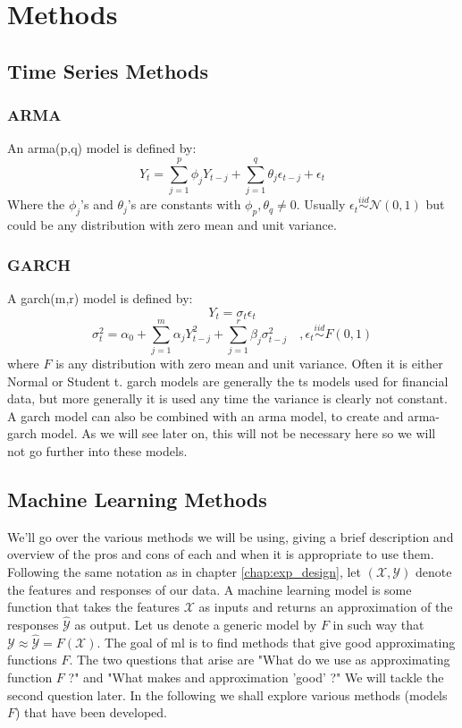 \chapter{Methods}

\section{Time Series Methods}
\subsection{ARMA}
An \acrfull{arma}(p,q) model is defined by:
$$
Y_t = \sum_{j=1}^p \phi_j Y_{t-j} + \sum_{j=1}^q \theta_j \epsilon_{t-j} + \epsilon_t
$$
Where the $\phi_j$'s and $\theta_j$'s are constants with $\phi_p , \theta_q \neq 0$. Usually $\epsilon_t \stackrel{iid}{\sim} \mathcal{N}(0,1)$ but could be any distribution with zero mean and unit variance.
\subsection{GARCH}
A \acrfull{garch}(m,r) model is defined by:
$$
Y_t = \sigma_t \epsilon_t
$$
$$
\sigma_t^2 = \alpha_0 + \sum_{j=1}^m \alpha_j Y_{t-j}^2 + \sum_{j=1}^r \beta_j \sigma_{t-j}^2
\quad, \epsilon_t \stackrel{iid}{\sim} F(0,1)
$$
where $F$ is any distribution with zero mean and unit variance. Often it is either Normal or Student t.
\acrshort{garch} models are generally the \acrlong{ts} models used for financial data, but more generally it is used any time the variance is clearly not constant. A \acrshort{garch} model can also be combined with an \acrshort{arma} model, to create and \acrshort{arma}-\acrshort{garch} model. As we will see later on, this will not be necessary here so we will not go further into these models.

\section{Machine Learning Methods}
We'll go over the various methods we will be using, giving a brief description and overview of the pros and cons of each and when it is appropriate to use them.
Following the same notation as in chapter \ref{chap:exp_design}, let $(\mathcal{X},\mathcal{Y})$ denote the features and responses of our data. A machine learning model is some function that takes the features $\mathcal{X}$ as inputs and returns an approximation of the responses $\hat{\mathcal{Y}}$ as output. Let us denote a generic model by $F$ in such way that $\mathcal{Y} \approx \hat{\mathcal{Y}}=F(\mathcal{X})$.
The goal of \acrshort{ml} is to find methods that give good approximating functions $F$. The two questions that arise are "What do we use as approximating function $F$ ?" and "What makes and approximation 'good' ?" We will tackle the second question later. In the following we shall explore various methods (models $F$) that have been developed.

